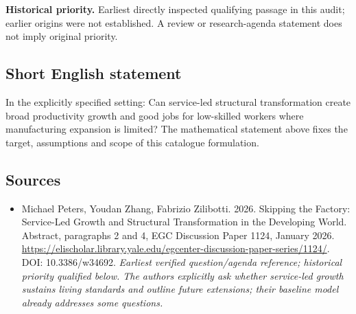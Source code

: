 \documentclass[11pt]{article}
\begin{document}
\par\textbf{Historical priority.} Earliest directly inspected qualifying passage in this audit; earlier origins were not established. A review or research-agenda statement does not imply original priority.

\subsection{Short English statement}
In the explicitly specified setting: Can service-led structural transformation create broad productivity growth and good jobs for low-skilled workers where manufacturing expansion is limited? The mathematical statement above fixes the target, assumptions and scope of this catalogue formulation.

\subsection{Sources}
\begin{itemize}\raggedright
\item[\textnormal{[S1]}]\hypertarget{source:30007660:1}{} Michael Peters, Youdan Zhang, Fabrizio Zilibotti. 2026. Skipping the Factory: Service-Led Growth and Structural Transformation in the Developing World. Abstract, paragraphs 2 and 4, EGC Discussion Paper 1124, January 2026.
\url{https://elischolar.library.yale.edu/egcenter-discussion-paper-series/1124/}.
DOI: 10.3386/w34692.
{\small\textit{Earliest verified question/agenda reference; historical priority qualified below. The authors explicitly ask whether service-led growth sustains living standards and outline future extensions; their baseline model already addresses some questions.}}
\end{itemize}
\end{document}
